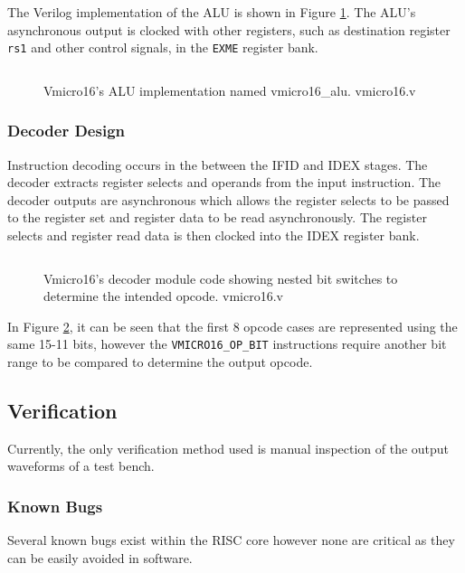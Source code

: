 \documentclass[11pt,a4paper]{report}
\begin{document}
{The Verilog implementation of the ALU is shown in Figure \ref{fig:aluv}. The ALU's asynchronous output is clocked with other registers, such as destination register \verb|rs1| and other control signals, in the \verb|EXME| register bank.
\begin{figure}[H]
\centering
\inputminted[fontsize=\footnotesize,firstline=322,lastline=335,linenos]{verilog}{../../vmicro16/vmicro16.v}
\caption{Vmicro16's ALU implementation named vmicro16\_alu. vmicro16.v}
\label{fig:aluv}
\end{figure}




\subsubsection{Decoder Design}
Instruction decoding occurs in the between the IFID and IDEX stages. 
The decoder extracts register selects and operands from the input instruction. The decoder outputs are asynchronous which allows the register selects to be passed to the register set and register data to be read asynchronously. The register selects and register read data is then clocked into the IDEX register bank.

\begin{figure}[H]
\centering
\inputminted[fontsize=\footnotesize,firstline=224,lastline=245,linenos]{verilog}{../../vmicro16/vmicro16.v}
\caption{Vmicro16's decoder module code showing nested bit switches to determine the intended opcode. vmicro16.v}
\label{fig:decoder}
\end{figure}

In Figure \ref{fig:decoder}, it can be seen that the first 8 opcode cases are represented using the same 15-11 bits, however the \verb|VMICRO16_OP_BIT| instructions require another bit range to be compared to determine the output opcode.

\subsection{Verification}
Currently, the only verification method used is manual inspection of the output waveforms of a test bench.

\subsubsection{Known Bugs}
Several known bugs exist within the RISC core however none are critical as they can be easily avoided in software.

}
\end{document}
